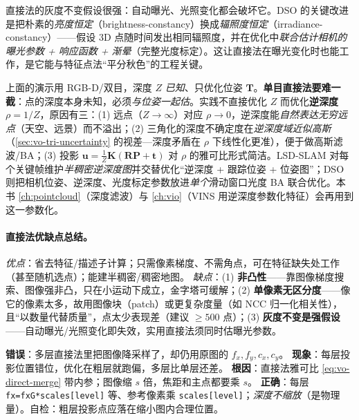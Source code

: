 \begin{insight}
直接法的灰度不变假设很强：自动曝光、光照变化都会破坏它。DSO\cite{engel2017dso,carlone2026handbook} 的关键改进是把朴素的\emph{亮度恒定}（brightness-constancy）换成\emph{辐照度恒定}（irradiance-constancy）——假设 3D 点随时间发出相同辐照度，并在优化中\emph{联合估计相机的曝光参数 + 响应函数 + 渐晕}（完整光度标定）。这让直接法在曝光变化时也能工作，是它能与特征点法“平分秋色”的工程关键。
\end{insight}

\begin{insight}
上面的演示用 RGB-D/双目，深度 $Z$ \emph{已知}、只优化位姿 $\mathbf{T}$。\textbf{单目直接法要难一截}：点的深度本身未知，必须\emph{与位姿一起估}\cite{engel2014lsd,engel2017dso}。实践不直接优化 $Z$ 而优化\textbf{逆深度} $\rho=1/Z$，原因有三：(1) 远点（$Z\!\to\!\infty$）对应 $\rho\!\to\!0$，逆深度能\emph{自然表达无穷远点}（天空、远景）而不溢出；(2) 三角化的深度不确定度在\emph{逆深度域近似高斯}（\cref{sec:vo-tri-uncertainty} 的视差—深度矛盾在 $\rho$ 下线性化更准），便于做高斯滤波/BA；(3) 投影 $\mathbf{u}=\tfrac1{Z}\mathbf{K}(\mathbf{R}\mathbf{P}+\mathbf{t})$ 对 $\rho$ 的雅可比形式简洁。LSD-SLAM\cite{engel2014lsd} 对每个关键帧维护\emph{半稠密逆深度图}并交替优化“逆深度 + 跟踪位姿 + 位姿图”；DSO\cite{engel2017dso} 则把相机位姿、逆深度、光度标定参数放进\emph{单个}滑动窗口光度 BA 联合优化。本书 \cref{ch:pointcloud}（深度滤波）与 \cref{ch:vio}（VINS 用逆深度参数化特征）会再用到这一参数化。
\end{insight}

\paragraph{直接法优缺点总结\cite{gaoxiang2019slam14}。}
\emph{优点}：省去特征/描述子计算；只需像素梯度、不需角点，可在特征缺失处工作（甚至随机选点）；能建半稠密/稠密地图。
\emph{缺点}：(1) \textbf{非凸性}——靠图像梯度搜索、图像强非凸，只在小运动下成立，金字塔可缓解；(2) \textbf{单像素无区分度}——像它的像素太多，故用图像块（patch）或更复杂度量（如 NCC 归一化相关性），且“以数量代替质量”，点太少表现差（建议 $\ge500$ 点）；(3) \textbf{灰度不变是强假设}——自动曝光/光照变化即失效，实用直接法须同时估曝光参数。

\begin{pitfall}
\textbf{错误}：多层直接法里把图像降采样了，却仍用原图的 $f_x,f_y,c_x,c_y$。
\textbf{现象}：每层投影位置错位，优化在粗层就跑偏，多层比单层还差。
\textbf{根因}：直接法雅可比 \cref{eq:vo-direct-merge} 带内参；图像缩 $s$ 倍，焦距和主点都要乘 $s$。
\textbf{正确}：每层 \texttt{fx=fxG*scales[level]} 等、参考像素乘 \texttt{scales[level]}；\emph{深度不缩放}（是物理量）。自检：粗层投影点应落在缩小图内合理位置。
\end{pitfall}

